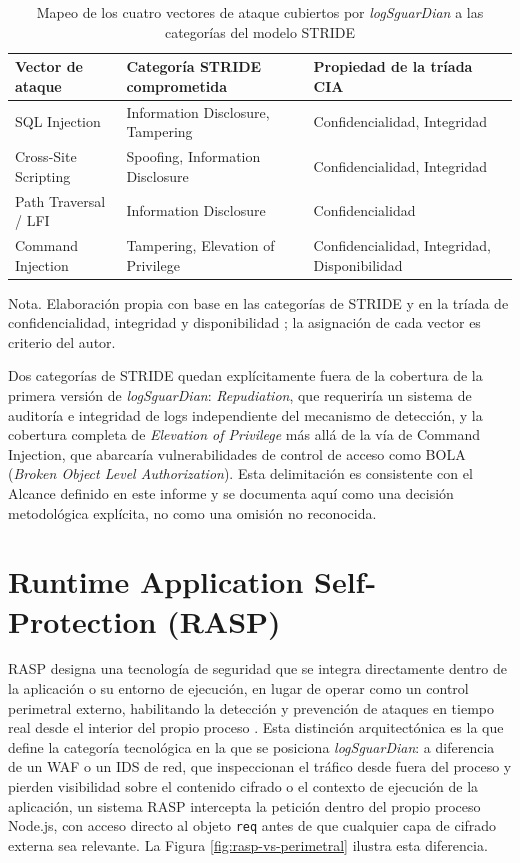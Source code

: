 \begin{table}[H]
\centering
\small
\begin{tabular}{|L{3.4cm}|L{5.0cm}|L{4.6cm}|}
\hline
\textbf{Vector de ataque} & \textbf{Categoría STRIDE comprometida} & \textbf{Propiedad de la tríada CIA} \\ \hline
SQL Injection & Information Disclosure, Tampering & Confidencialidad, Integridad \\ \hline
Cross-Site Scripting & Spoofing, Information Disclosure & Confidencialidad, Integridad \\ \hline
Path Traversal / LFI & Information Disclosure & Confidencialidad \\ \hline
Command Injection & Tampering, Elevation of Privilege & Confidencialidad, Integridad, Disponibilidad \\ \hline
\end{tabular}
\caption[Mapeo de vectores de ataque a categorías STRIDE]{Mapeo de los cuatro vectores de ataque cubiertos por \textit{logSguarDian} a las categorías del modelo STRIDE}
\label{cuadro:stride}
\end{table}
{\footnotesize Nota. Elaboración propia con base en las categorías de STRIDE \cite{microsoft2025stride} y en la tríada de confidencialidad, integridad y disponibilidad \cite{nistinfosec2026}; la asignación de cada vector es criterio del autor.}

Dos categorías de STRIDE quedan explícitamente fuera de la cobertura de la primera versión de
\textit{logSguarDian}: \textit{Repudiation}, que requeriría un sistema de auditoría e integridad de
logs independiente del mecanismo de detección, y la cobertura completa de \textit{Elevation of
Privilege} más allá de la vía de Command Injection, que abarcaría vulnerabilidades de control de
acceso como BOLA (\textit{Broken Object Level Authorization}). Esta delimitación es consistente
con el Alcance definido en este informe y se documenta aquí como una decisión metodológica
explícita, no como una omisión no reconocida.

\section{Runtime Application Self-Protection (RASP)}
\label{sec:rasp}
RASP designa una tecnología de seguridad que se integra directamente dentro de la aplicación o su
entorno de ejecución, en lugar de operar como un control perimetral externo, habilitando la
detección y prevención de ataques en tiempo real desde el interior del propio proceso \cite{contrastsecurity,bermejohiguera2022}. Esta distinción arquitectónica es la que define la categoría tecnológica en la
que se posiciona \textit{logSguarDian}: a diferencia de un WAF o un IDS de red, que inspeccionan
el tráfico desde fuera del proceso y pierden visibilidad sobre el contenido cifrado o el contexto de
ejecución de la aplicación, un sistema RASP intercepta la petición dentro del propio proceso
Node.js, con acceso directo al objeto \texttt{req} antes de que cualquier capa de cifrado externa
sea relevante. La Figura \ref{fig:rasp-vs-perimetral} ilustra esta diferencia.

